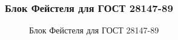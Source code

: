 \begin{frame}
    \frametitle{Блок Фейстеля для ГОСТ 28147-89}
    
    \begin{figure}
        \begin{center}
        \end{center}
        \caption{Блок Фейстеля для ГОСТ 28147-89}\label{pict:gost}
    \end{figure}
\end{frame}


